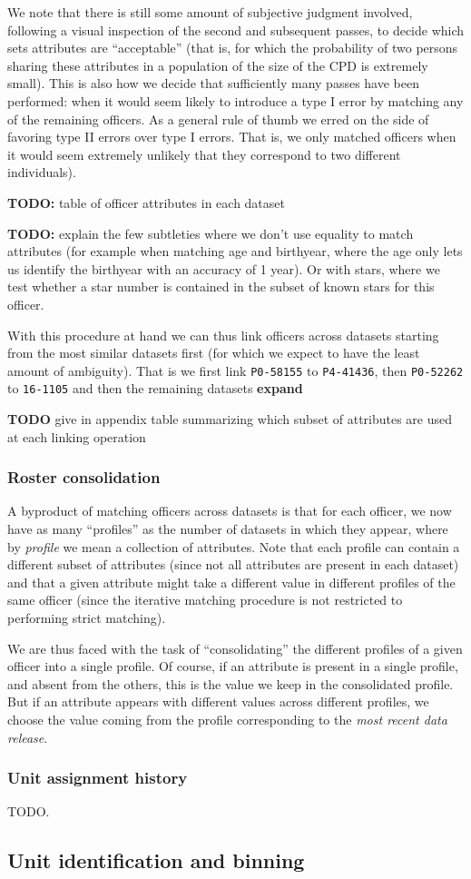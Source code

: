 We note that there is still some amount of subjective judgment involved,
following a visual inspection of the second and subsequent passes, to decide
which sets attributes are ``acceptable'' (that is, for which the probability of
two persons sharing these attributes in a population of the size of the CPD is
extremely small). This is also how we decide that sufficiently many passes have
been performed: when it would seem likely to introduce a type I error by
matching any of the remaining officers. As a general rule of thumb we erred on
the side of favoring type II errors over type I errors. That is, we only
matched officers when it would seem extremely unlikely that they correspond to
two different individuals).

\textbf{TODO:} table of officer attributes in each dataset

\textbf{TODO:} explain the few subtleties where we don't use equality to match
attributes (for example when matching age and birthyear, where the age only
lets us identify the birthyear with an accuracy of 1 year). Or with stars,
where we test whether a star number is contained in the subset of known stars
for this officer.

With this procedure at hand we can thus link officers across datasets starting
from the most similar datasets first (for which we expect to have the least
amount of ambiguity). That is we first link \texttt{P0-58155} to
\texttt{P4-41436}, then \texttt{P0-52262} to \texttt{16-1105} and then the
remaining datasets \textbf{expand}

\textbf{TODO} give in appendix table summarizing which subset of attributes are
used at each linking operation 

\subsubsection{Roster consolidation}

A byproduct of matching officers across datasets is that for each officer, we
now have as many “profiles” as the number of datasets in which they appear,
where by \emph{profile} we mean a collection of attributes. Note that each
profile can contain a different subset of attributes (since not all attributes
are present in each dataset) and that a given attribute might take a different
value in different profiles of the same officer (since the iterative matching
procedure is not restricted to performing strict matching).

We are thus faced with the task of “consolidating” the different profiles of
a given officer into a single profile. Of course, if an attribute is present in
a single profile, and absent from the others, this is the value we keep in the
consolidated profile. But if an attribute appears with different values across
different profiles, we choose the value coming from the profile corresponding
to the \emph{most recent data release}.

\subsubsection{Unit assignment history} TODO.


\subsection{Unit identification and binning}
